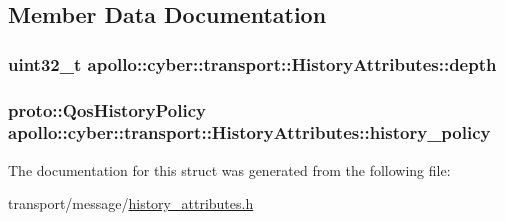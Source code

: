 \subsection{Member Data Documentation}
\hypertarget{structapollo_1_1cyber_1_1transport_1_1HistoryAttributes_ab414b595e3a7f637657b854c36b3cfa9}{
\subsubsection[{depth}]{\setlength{\rightskip}{0pt plus 5cm}uint32\-\_\-t apollo\-::cyber\-::transport\-::\-History\-Attributes\-::depth}}\label{structapollo_1_1cyber_1_1transport_1_1HistoryAttributes_ab414b595e3a7f637657b854c36b3cfa9}
\hypertarget{structapollo_1_1cyber_1_1transport_1_1HistoryAttributes_ad5b9c8f33bf4b55830eace547e39b8eb}{
\subsubsection[{history\-\_\-policy}]{\setlength{\rightskip}{0pt plus 5cm}proto\-::\-Qos\-History\-Policy apollo\-::cyber\-::transport\-::\-History\-Attributes\-::history\-\_\-policy}}\label{structapollo_1_1cyber_1_1transport_1_1HistoryAttributes_ad5b9c8f33bf4b55830eace547e39b8eb}


The documentation for this struct was generated from the following file\-:\begin{DoxyCompactItemize}
\item 
transport/message/\hyperlink{history__attributes_8h}{history\-\_\-attributes.\-h}\end{DoxyCompactItemize}
